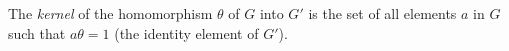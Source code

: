 The \textit{kernel} of the homomorphism $\theta$ of $G$ into $G'$ is the set of all elements $a$ in $G$ such that $a\theta = 1$ (the identity element of $G'$).
